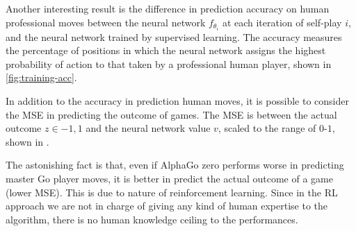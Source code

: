 \documentclass{article}
\begin{document}
Another interesting result is the difference in prediction accuracy on human professional moves between the neural network $f_{\theta_i}$ at each iteration of self-play $i$, and the neural network trained by supervised learning. The accuracy measures the percentage of positions in which the neural network assigns the highest probability of action to that taken by a professional human player, shown in \autoref{fig:training-acc}.

In addition to the accuracy in prediction human moves, it is possible to consider the MSE in predicting the outcome of games. The MSE is between the actual outcome $z \in {-1, 1}$ and the neural network value $v$, scaled to the range of $0$-$1$, shown in .

The astonishing fact is that, even if AlphaGo zero performs worse in predicting master Go player moves, it is better in predict the actual outcome of a game (lower MSE). This is due to nature of reinforcement learning. Since in the RL approach we are not in charge of giving any kind of human expertise to the algorithm, there is no human knowledge ceiling to the performances.
\end{document}
